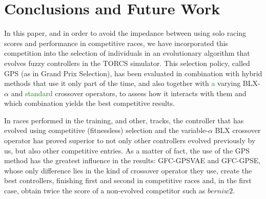 \documentclass[10pt,journal,compsoc]{IEEEtran}
\begin{document}
\section{Conclusions and Future Work} 
\label{sec:conclusions}

In this paper, and in order to avoid the impedance between using solo
racing scores and performance in competitive races, we have
incorporated this competition into the selection of individuals in an
evolutionary algorithm that evolves fuzzy controllers in the TORCS
simulator. This selection policy, called GPS (as in Grand Prix
Selection), has been evaluated in combination with hybrid methods that
use it only part of the time, and also together with \textcolor{green}{a} varying
BLX-$\alpha$ and \textcolor{green}{ standard} crossover operators, to assess how it
interacts with them and which combination yields the best competitive
results.


In races performed in the training, and other, tracks, the controller
that has evolved using competitive (fitnessless) selection and the
variable-$\alpha$ BLX crossover operator has proved superior to not
only other controllers evolved previously by us, but also other
competitive entries. As a matter of fact, the use of the GPS method has the greatest
influence in the results: {\sf GFC-GPSVAE} and {\sf GFC-GPSE}, whose only
difference lies in the kind of crossover operator they use, create the
best controllers, finishing first and second in competitive races and,
in the first case, obtain twice the score of a non-evolved
competitor such as $berniw2$.
\end{document}
